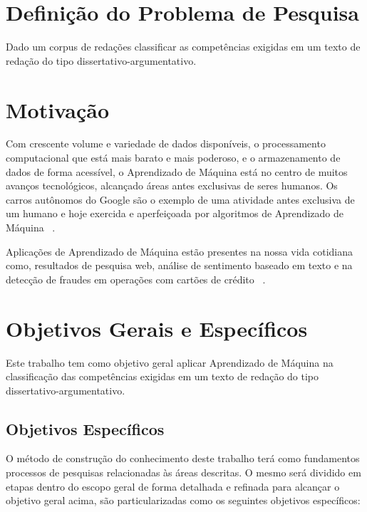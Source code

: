 \section{Definição do Problema de Pesquisa}

Dado um corpus de redações classificar as competências exigidas em um texto de redação do tipo dissertativo-argumentativo.

\section{Motivação}

Com crescente volume e variedade de dados disponíveis, o processamento computacional que está mais barato e mais poderoso, e o armazenamento de dados de forma acessível, o Aprendizado de Máquina está no centro de muitos avanços tecnológicos, alcançado áreas antes exclusivas de seres humanos. Os carros autônomos do Google são o exemplo de uma atividade antes exclusiva de um humano e hoje exercida e aperfeiçoada por algoritmos de Aprendizado de Máquina ~\cite{waymo:2017}.

Aplicações de Aprendizado de Máquina estão presentes na nossa vida cotidiana como, resultados de pesquisa web, análise de sentimento baseado em texto e na detecção de fraudes em operações com cartões de crédito ~\cite{batista1999aplicando}.

\section{Objetivos Gerais e Específicos}

Este trabalho tem como objetivo geral aplicar Aprendizado de Máquina na classificação das competências exigidas em um texto de redação do tipo dissertativo-argumentativo.

\subsection{Objetivos Específicos}

O método de construção do conhecimento deste trabalho terá como fundamentos processos de pesquisas relacionadas às áreas descritas. O mesmo será dividido em etapas dentro do escopo geral de forma detalhada e refinada para alcançar o objetivo geral acima, são particularizadas como os seguintes objetivos específicos:

